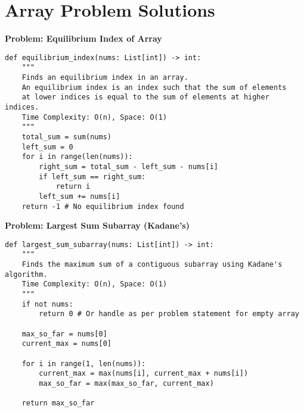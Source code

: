 % 
% 
\section*{Array Problem Solutions}

\noindent\textbf{Problem: Equilibrium Index of Array}
\begin{verbatim}
def equilibrium_index(nums: List[int]) -> int:
    """
    Finds an equilibrium index in an array.
    An equilibrium index is an index such that the sum of elements
    at lower indices is equal to the sum of elements at higher indices.
    Time Complexity: O(n), Space: O(1)
    """
    total_sum = sum(nums)
    left_sum = 0
    for i in range(len(nums)):
        right_sum = total_sum - left_sum - nums[i]
        if left_sum == right_sum:
            return i
        left_sum += nums[i]
    return -1 # No equilibrium index found
\end{verbatim}

\noindent\textbf{Problem: Largest Sum Subarray (Kadane’s)}
\begin{verbatim}
def largest_sum_subarray(nums: List[int]) -> int:
    """
    Finds the maximum sum of a contiguous subarray using Kadane's algorithm.
    Time Complexity: O(n), Space: O(1)
    """
    if not nums:
        return 0 # Or handle as per problem statement for empty array

    max_so_far = nums[0]
    current_max = nums[0]

    for i in range(1, len(nums)):
        current_max = max(nums[i], current_max + nums[i]) 
        max_so_far = max(max_so_far, current_max)
    
    return max_so_far
\end{verbatim}

